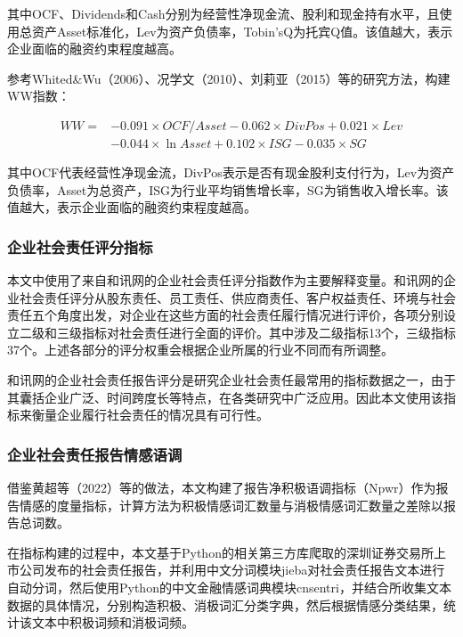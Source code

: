 \documentclass[12pt,a4paper]{article}
\begin{document}
其中OCF、Dividends和Cash分别为经营性净现金流、股利和现金持有水平，且使用总资产Asset标准化，Lev为资产负债率，Tobin'sQ为托宾Q值。该值越大，表示企业面临的融资约束程度越高。

参考Whited\&Wu（2006）、况学文（2010）、刘莉亚（2015）等的研究方法，构建WW指数：

\begin{equation}
    \begin{split}
        WW = &-0.091 \times OCF/Asset - 0.062 \times DivPos + 0.021 \times Lev \\
        &- 0.044 \times \ln Asset + 0.102 \times ISG - 0.035 \times SG
    \end{split}
    \label{eq6}
\end{equation}

其中OCF代表经营性净现金流，DivPos表示是否有现金股利支付行为，Lev为资产负债率，Asset为总资产，ISG为行业平均销售增长率，SG为销售收入增长率。该值越大，表示企业面临的融资约束程度越高。

\subsubsection{企业社会责任评分指标}

本文中使用了来自和讯网的企业社会责任评分指数作为主要解释变量。和讯网的企业社会责任评分从股东责任、员工责任、供应商责任、客户权益责任、环境与社会责任五个角度出发，对企业在这些方面的社会责任履行情况进行评价，各项分别设立二级和三级指标对社会责任进行全面的评价。其中涉及二级指标13个，三级指标37个。上述各部分的评分权重会根据企业所属的行业不同而有所调整。

和讯网的企业社会责任报告评分是研究企业社会责任最常用的指标数据之一，由于其囊括企业广泛、时间跨度长等特点，在各类研究中广泛应用。因此本文使用该指标来衡量企业履行社会责任的情况具有可行性。

\subsubsection{企业社会责任报告情感语调}

借鉴黄超等（2022）等的做法，本文构建了报告净积极语调指标（Npwr）作为报告情感的度量指标，计算方法为积极情感词汇数量与消极情感词汇数量之差除以报告总词数。

在指标构建的过程中，本文基于Python的相关第三方库爬取的深圳证券交易所上市公司发布的社会责任报告，并利用中文分词模块jieba对社会责任报告文本进行自动分词，然后使用Python的中文金融情感词典模块cnsentri，并结合所收集文本数据的具体情况，分别构造积极、消极词汇分类字典，然后根据情感分类结果，统计该文本中积极词频和消极词频。
\end{document}

